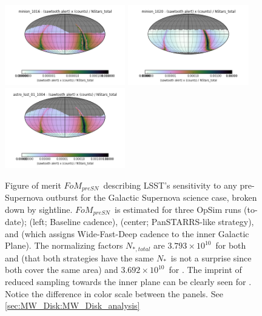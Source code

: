 \begin{figure}
\begin{center}
  \includegraphics[width=5.25cm]{./figs/milkyway/galacticSN_SkyMap_Baseline.png}
  \includegraphics[width=5.25cm]{./figs/milkyway/galacticSN_SkyMap_PanSTARRS.png}
  \includegraphics[width=5.25cm]{./figs/milkyway/galacticSN_SkyMap_PlaneWFD.png}
  \caption{Figure of merit $FoM_{preSN}$~describing LSST's sensitivity
  to any pre-Supernova outburst for the Galactic Supernova science case,
  broken down by sightline. $FoM_{preSN}$~is estimated for
  three OpSim runs (to-date);  (left; Baseline
  cadence),  (center; PanSTARRS-like
  strategy), and  (which assigns Wide-Fast-Deep cadence to the inner Galactic Plane). The normalizing factors $N_{\ast, total}$ are $3.793 \times 10^{10}$~for both  and  (that both strategies have the same $N_\ast$~is not a surprise since both cover the same area) and $3.692\times
  10^{10}$~for . The imprint of reduced sampling towards
  the inner plane can be clearly seen for .
  Notice the difference in color scale between the panels. See \autoref{sec:MW_Disk:MW_Disk_analysis}}
\label{f_opSim_GalacticSN}
\end{center}
\end{figure}


